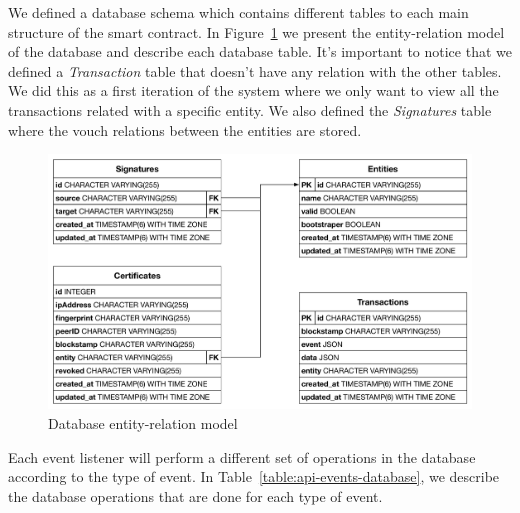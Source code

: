 We defined a database schema which contains different tables to each main structure of the smart contract.
In Figure~\ref{fig:database-schema} we present the entity-relation model of the database and describe each database table.
It's important to notice that we defined a \textit{Transaction} table that doesn't have any relation with the other tables.
We did this as a first iteration of the system where we only want to view all the transactions related with a specific entity.
We also defined the \textit{Signatures} table where the vouch relations between the entities are stored.

\begin{figure}[h!]
  \centering
  \includegraphics[scale=0.4]{Figures/api-database-schema.pdf}
  \caption{Database entity-relation model}
\label{fig:database-schema}
\end{figure}

Each event listener will perform a different set of operations in the database according to the type of event.
In Table~\ref{table:api-events-database}, we describe the database operations that are done for each type of event.

